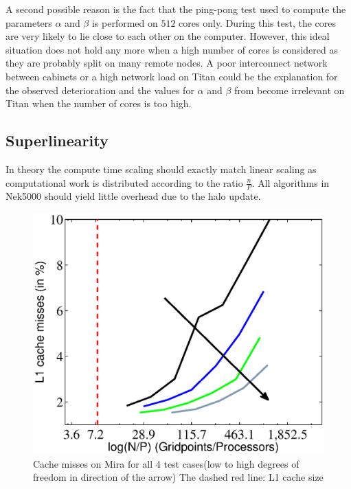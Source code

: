 \documentclass{sig-alternate}
\begin{document}
A second possible reason is the fact that the ping-pong test used to compute the parameters $\alpha$ and $\beta$ is performed on $512$ 
cores only. During this test, the cores are very likely to lie close to each other on the computer. 
However, this ideal situation does not hold any more when a high number of cores
is considered as they are probably split on many remote nodes.
A poor interconnect network between cabinets or a high network load on Titan 
could be the explanation for the observed deterioration and the values for 
$\alpha$ and $\beta$ from  become irrelevant on Titan 
when the number of cores is too high.


\subsection{Superlinearity}

In theory the compute time scaling should exactly match linear scaling
as computational work is distributed according to the ratio $\frac{n}{P}$. All
algorithms in Nek5000 should yield little overhead due to the halo update.

\begin{figure}
  \centering
  \includegraphics[width=\linewidth]{./figures/cachearrow.eps}
  \caption{Cache misses on Mira for all 4 test cases(low to high degrees of freedom in direction of the arrow) The dashed red line: L1 cache size}
   \label{fig:cachemisses}
\end{figure}
\end{document}
